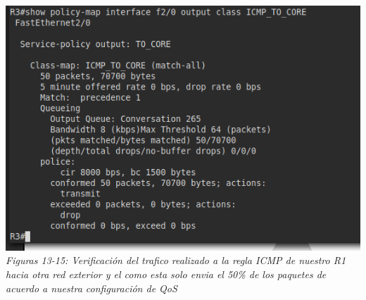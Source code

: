 \documentclass[10pt]{article}
\begin{document}
\begin{center}
  \includegraphics[scale=0.5]{imgs/15.png}
  \\\textit{Figuras 13-15: Verificación del trafico realizado a la regla ICMP de nuestro R1 hacia otra red exterior y el como esta solo envia el 50\% de los paquetes de acuerdo a nuestra configuración de QoS}
\end{center}
\end{document}
